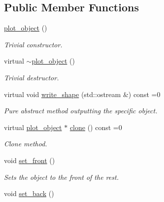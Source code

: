 \subsection*{Public Member Functions}
\begin{DoxyCompactItemize}
\item 
\hypertarget{a00424_a2fc9a8e4f8aee5c6e519c612b2d01ec8}{\hyperlink{a00424_a2fc9a8e4f8aee5c6e519c612b2d01ec8}{plot\-\_\-object} ()}\label{a00424_a2fc9a8e4f8aee5c6e519c612b2d01ec8}

\begin{DoxyCompactList}\small\item\em Trivial constructor. \end{DoxyCompactList}\item 
\hypertarget{a00424_a5d149a4f6f95cc2d7b3d11c611124b54}{virtual \hyperlink{a00424_a5d149a4f6f95cc2d7b3d11c611124b54}{$\sim$plot\-\_\-object} ()}\label{a00424_a5d149a4f6f95cc2d7b3d11c611124b54}

\begin{DoxyCompactList}\small\item\em Trivial destructor. \end{DoxyCompactList}\item 
\hypertarget{a00424_ae86f5349ad2f170c516fa800ffac1ba2}{virtual void \hyperlink{a00424_ae86f5349ad2f170c516fa800ffac1ba2}{write\-\_\-shape} (std\-::ostream \&) const =0}\label{a00424_ae86f5349ad2f170c516fa800ffac1ba2}

\begin{DoxyCompactList}\small\item\em Pure abstract method outputting the specific object. \end{DoxyCompactList}\item 
\hypertarget{a00424_ac8f493432ca28c639518e2a2d00eb0ce}{virtual \hyperlink{a00424}{plot\-\_\-object} $\ast$ \hyperlink{a00424_ac8f493432ca28c639518e2a2d00eb0ce}{clone} () const =0}\label{a00424_ac8f493432ca28c639518e2a2d00eb0ce}

\begin{DoxyCompactList}\small\item\em Clone method. \end{DoxyCompactList}\item 
\hypertarget{a00424_a46a47ea9f30e1e9ae8962777c4afd141}{void \hyperlink{a00424_a46a47ea9f30e1e9ae8962777c4afd141}{set\-\_\-front} ()}\label{a00424_a46a47ea9f30e1e9ae8962777c4afd141}

\begin{DoxyCompactList}\small\item\em Sets the object to the front of the rest. \end{DoxyCompactList}\item 
\hypertarget{a00424_ac3c24aea8746e470cd47a9f6bf9166b4}{void \hyperlink{a00424_ac3c24aea8746e470cd47a9f6bf9166b4}{set\-\_\-back} ()}\label{a00424_ac3c24aea8746e470cd47a9f6bf9166b4}


\end{DoxyCompactItemize}
